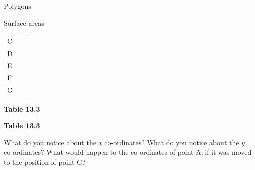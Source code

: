 \begin{exercises}{Polygons}
\begin{exercises}{Surface areas }
\begin{table}[H]
\begin{center}
\begin{xtabular}[t]{|l|l|l|}
    
        C &
    
    
         &
    
    
     \tabularnewline{}
    
    
        D &
    
    
         &
    
    
     \tabularnewline{}
    
    
        E &
    
    
         &
    
    
     \tabularnewline{}
    
    
        F &
    
    
         &
    
    
     \tabularnewline{}
    
    
        G &
    
    
         &
    
    
     \tabularnewline{}
    \end{xtabular}
      \end{center}
    \begin{center}{\small\bfseries Table 13.3}\end{center}
    \begin{caption}{\small\bfseries Table 13.3}\end{caption}
\end{table}
      
    \par
  
        
        \label{m39358*id70410}What do you notice about the $x$ co-ordinates? What do you notice about the $y$ co-ordinates?
What would happen to the co-ordinates of point A, if it was moved to the position of point G?
 \par 


\end{exercises}
\end{exercises}
